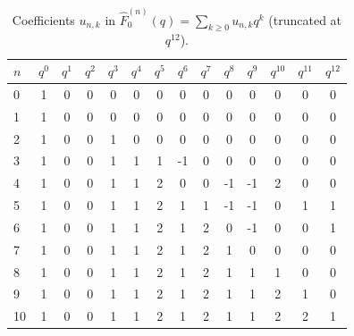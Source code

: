 \documentclass[letterpaper,12pt]{article}
\begin{document}
\begin{table}[H]

\begin{tabular*}{\linewidth}{@{\extracolsep{\fill}}l|ccccccccccccc@{}}
\toprule
$n$ & $q^0$ & $q^1$ & $q^2$ & $q^3$ & $q^4$ & $q^5$ & $q^6$ & $q^7$ & $q^8$ & $q^9$ & $q^{10}$ & $q^{11}$ & $q^{12}$ \\
\midrule
0  & 1 & 0 & 0 & 0 & 0 & 0 & 0 & 0 & 0 & 0 & 0 & 0 & 0 \\
1  & 1 & 0 & 0 & 0 & 0 & 0 & 0 & 0 & 0 & 0 & 0 & 0 & 0 \\
2  & 1 & 0 & 0 & 1 & 0 & 0 & 0 & 0 & 0 & 0 & 0 & 0 & 0 \\
3  & 1 & 0 & 0 & 1 & 1 & 1 & -1 & 0 & 0 & 0 & 0 & 0 & 0 \\
4  & 1 & 0 & 0 & 1 & 1 & 2 & 0 & 0 & -1 & -1 & 2 & 0 & 0 \\
5  & 1 & 0 & 0 & 1 & 1 & 2 & 1 & 1 & -1 & -1 & 0 & 1 & 1 \\
6  & 1 & 0 & 0 & 1 & 1 & 2 & 1 & 2 & 0 & -1 & 0 & 0 & 1 \\
7  & 1 & 0 & 0 & 1 & 1 & 2 & 1 & 2 & 1 & 0 & 0 & 0 & 0 \\
8  & 1 & 0 & 0 & 1 & 1 & 2 & 1 & 2 & 1 & 1 & 1 & 0 & 0 \\
9  & 1 & 0 & 0 & 1 & 1 & 2 & 1 & 2 & 1 & 1 & 2 & 1 & 0 \\
10 & 1 & 0 & 0 & 1 & 1 & 2 & 1 & 2 & 1 & 1 & 2 & 2 & 1 \\
\bottomrule
\end{tabular*}
\caption{Coefficients $u_{n,k}$ in $\widehat F^{(n)}_0(q)=\sum_{k\ge0} u_{n,k}q^k$ (truncated at $q^{12}$).}\label{tab:F0hat-coeff}
\end{table}
\end{document}
